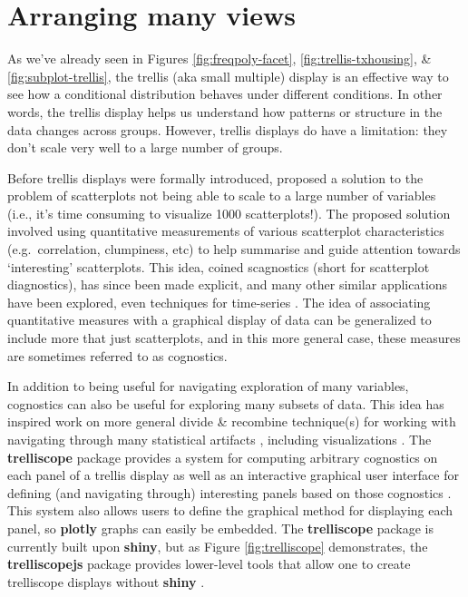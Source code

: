 \documentclass[
  12pt,
]{krantz}
\begin{document}
\hypertarget{navigating-many-views}{%
\section{Arranging many views}\label{navigating-many-views}}

As we've already seen in Figures \ref{fig:freqpoly-facet}, \ref{fig:trellis-txhousing}, \& \ref{fig:subplot-trellis}, the trellis (aka small multiple) display is an effective way to see how a conditional distribution behaves under different conditions. In other words, the trellis display helps us understand how patterns or structure in the data changes across groups. However, trellis displays do have a limitation: they don't scale very well to a large number of groups.

Before trellis displays were formally introduced, \citet{scagnostics-tukey} proposed a solution to the problem of scatterplots not being able to scale to a large number of variables (i.e., it's time consuming to visualize 1000 scatterplots!). The proposed solution involved using quantitative measurements of various scatterplot characteristics (e.g.~correlation, clumpiness, etc) to help summarise and guide attention towards `interesting' scatterplots. This idea, coined scagnostics (short for scatterplot diagnostics), has since been made explicit, and many other similar applications have been explored, even techniques for time-series \citep{Wilkinson:2005b, Wilkinson:2008, Wilkinson:2012}. The idea of associating quantitative measures with a graphical display of data can be generalized to include more that just scatterplots, and in this more general case, these measures are sometimes referred to as cognostics.

In addition to being useful for navigating exploration of many variables, cognostics can also be useful for exploring many subsets of data. This idea has inspired work on more general divide \& recombine technique(s) for working with navigating through many statistical artifacts \citep{divide-recombine, RHIPE}, including visualizations \citep{trelliscope}. The \textbf{trelliscope} package provides a system for computing arbitrary cognostics on each panel of a trellis display as well as an interactive graphical user interface for defining (and navigating through) interesting panels based on those cognostics \citep{trelliscope-pkg}. This system also allows users to define the graphical method for displaying each panel, so \textbf{plotly} graphs can easily be embedded. The \textbf{trelliscope} package is currently built upon \textbf{shiny}, but as Figure \ref{fig:trelliscope} demonstrates, the \textbf{trelliscopejs} package provides lower-level tools that allow one to create trelliscope displays without \textbf{shiny} \citep{trelliscopejs}.
\end{document}

